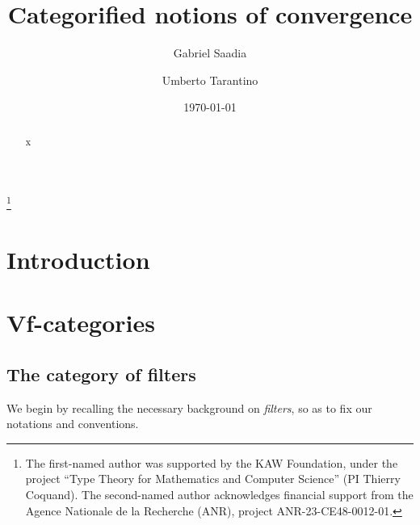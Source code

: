 


\title{Categorified notions of convergence}

\date{\today}

\author{Gabriel Saadia}
\author{Umberto Tarantino}

\address{
Gabriel \textsc{Saadia} \newline
Department of Mathematics\newline
Stockholm University\newline
Stockholm, Sweden\newline
{}
}

\address{
Umberto \textsc{Tarantino} \newline
Université Paris Cité, CNRS, IRIF, F-75013\newline
Paris, France\newline
\href{mailto:tarantino@irif.fr}{\sf tarantino@irif.fr}
}


\thanks{The first-named author was supported by the KAW Foundation, under the project “Type Theory for Mathematics and Computer Science” (PI Thierry Coquand). The second-named author acknowledges financial support from the Agence Nationale de la Recherche
(ANR), project ANR-23-CE48-0012-01.}



\begin{abstract}
    x
\end{abstract}

\maketitle
\setcounter{tocdepth}{2} 
\tableofcontents


\section{Introduction}


\section{Vf-categories}

\subsection{The category of filters}

We begin by recalling the necessary background on \emph{filters}, so as to fix our notations and conventions. 

